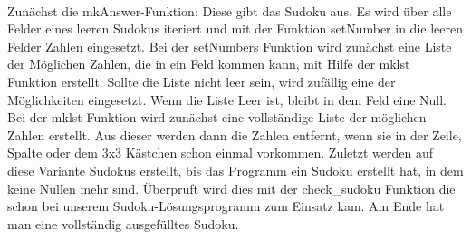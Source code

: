 \documentclass[11pt,a4paper]{article}
\begin{document}
\ \\
Zunächst die mkAnswer-Funktion: Diese gibt das Sudoku aus. Es wird über alle Felder eines leeren Sudokus iteriert und mit der Funktion setNumber in die leeren Felder Zahlen eingesetzt. Bei der setNumbers Funktion wird zunächst eine Liste der Möglichen Zahlen, die in ein Feld kommen kann, mit Hilfe der mklst Funktion erstellt. Sollte die Liste nicht leer sein, wird zufällig eine der Möglichkeiten eingesetzt. Wenn die Liste Leer ist, bleibt in dem Feld eine Null.
Bei der mklst Funktion wird zunächst eine vollständige Liste der möglichen Zahlen erstellt. Aus dieser werden dann die Zahlen entfernt, wenn sie in der Zeile, Spalte oder dem 3x3 Kästchen schon einmal vorkommen.
Zuletzt werden auf diese Variante Sudokus erstellt, bis das Programm ein Sudoku erstellt hat, in dem keine Nullen mehr sind. Überprüft wird dies mit der check\_sudoku Funktion die schon bei unserem Sudoku-Lösungsprogramm zum Einsatz kam. Am Ende hat man eine vollständig ausgefülltes Sudoku.
\ \\
\ \\
\end{document}
